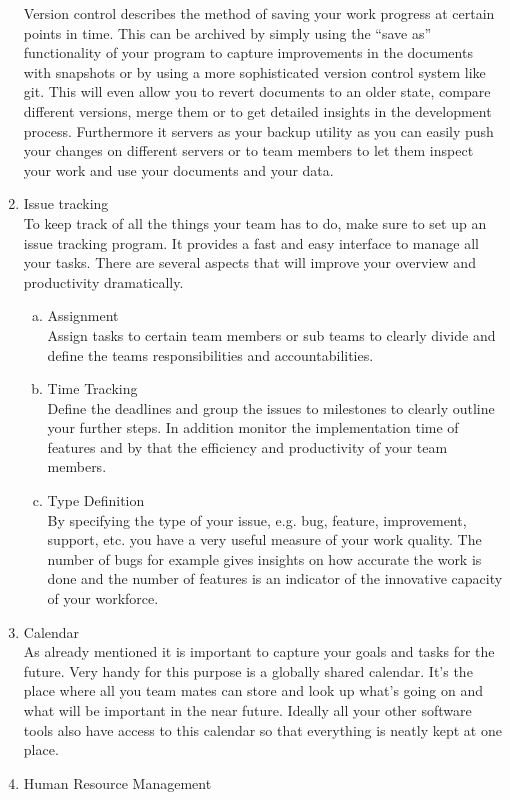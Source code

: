 \begin{multicols}{2}
\begin{enumerate}[1.]
Version control describes the method of saving your work progress at certain points in time. This can be archived by simply using the “save as” functionality of your program to capture improvements in the documents with snapshots or by using a more sophisticated version control system like git.
This will even allow you to revert documents to an older state, compare different versions, merge them or to get detailed insights in the development process. Furthermore it servers as your backup utility as you can easily push your changes on different servers or to team members to let them inspect your work and use your documents and your data.
	\item Issue tracking\\
To keep track of all the things your team has to do, make sure to set up an issue tracking program. It provides a fast and easy interface to manage all your tasks. There are several aspects that will improve your overview and productivity dramatically.
		\begin{enumerate}[a)]
		  \item Assignment\\
Assign tasks to certain team members or sub teams to clearly divide and define the teams responsibilities and accountabilities. 
		  \item Time Tracking\\
Define the deadlines and group the issues to milestones to clearly outline your further steps. In addition monitor the implementation time of features and by that the efficiency and productivity of your team members.
		  \item Type Definition\\
By specifying the type of your issue, e.g. bug, feature, improvement, support, etc. you have a very useful measure of your work quality. The number of bugs for example gives insights on how accurate the work is done and the number of features is an indicator of the innovative capacity of your workforce.
		\end{enumerate}
	\item Calendar\\
As already mentioned it is important to capture your goals and tasks for the future. Very handy for this purpose is a globally shared calendar. It’s the place where all you team mates can store and look up what’s going on and what will be important in the near future. Ideally all your other software tools also have access to this calendar so that everything is neatly kept at one place.
	\item Human Resource Management\\

\end{enumerate}
\end{multicols}
